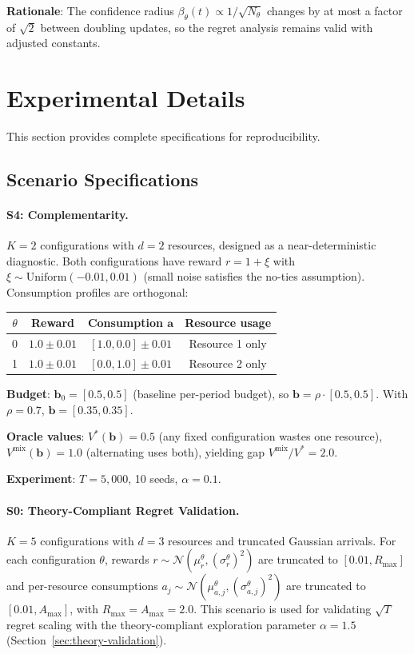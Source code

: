 \documentclass[11pt]{article}
\newcommand{\bb}{\mathbf{b}}
\newcommand{\ba}{\mathbf{a}}
\begin{document}
\textbf{Rationale}: The confidence radius $\beta_\theta(t) \propto 1/\sqrt{N_\theta}$ changes by at most a factor of $\sqrt{2}$ between doubling updates, so the regret analysis remains valid with adjusted constants.

\section{Experimental Details}
\label{app:experiments}

This section provides complete specifications for reproducibility.

\subsection{Scenario Specifications}

\paragraph{S4: Complementarity.}
$K=2$ configurations with $d=2$ resources, designed as a near-deterministic diagnostic. Both configurations have reward $r = 1 + \xi$ with $\xi \sim \mathrm{Uniform}(-0.01, 0.01)$ (small noise satisfies the no-ties assumption). Consumption profiles are orthogonal:

\begin{center}
\begin{tabular}{cccc}
\toprule
$\theta$ & Reward & Consumption $\ba$ & Resource usage \\
\midrule
0 & $1.0 \pm 0.01$ & $[1.0, 0.0] \pm 0.01$ & Resource 1 only \\
1 & $1.0 \pm 0.01$ & $[0.0, 1.0] \pm 0.01$ & Resource 2 only \\
\bottomrule
\end{tabular}
\end{center}

\textbf{Budget}: $\bb_0 = [0.5, 0.5]$ (baseline per-period budget), so $\bb = \rho \cdot [0.5, 0.5]$. With $\rho = 0.7$, $\bb = [0.35, 0.35]$.

\textbf{Oracle values}: $V^*(\bb) = 0.5$ (any fixed configuration wastes one resource), $V^{\mathrm{mix}}(\bb) = 1.0$ (alternating uses both), yielding gap $V^{\mathrm{mix}}/V^* = 2.0$.

\textbf{Experiment}: $T = 5{,}000$, 10 seeds, $\alpha = 0.1$.

\paragraph{S0: Theory-Compliant Regret Validation.}
$K=5$ configurations with $d=3$ resources and truncated Gaussian arrivals. For each configuration $\theta$, rewards $r \sim \mathcal{N}(\mu_r^\theta, (\sigma_r^\theta)^2)$ are truncated to $[0.01, R_{\max}]$ and per-resource consumptions $a_j \sim \mathcal{N}(\mu_{a,j}^\theta, (\sigma_{a,j}^\theta)^2)$ are truncated to $[0.01, A_{\max}]$, with $R_{\max} = A_{\max} = 2.0$. This scenario is used for validating $\sqrt{T}$ regret scaling with the theory-compliant exploration parameter $\alpha = 1.5$ (Section~\ref{sec:theory-validation}).
\end{document}
